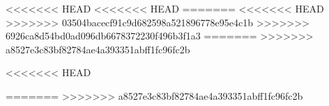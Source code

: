 \documentclass[12pt]{report} %
\begin{document}










\tableofcontents
\clearpage










\setcounter{romanPagenumber}{\value{page}}
\setcounter{page}{1}







<<<<<<< HEAD
<<<<<<< HEAD
=======
<<<<<<< HEAD
>>>>>>> 03504bacecf91c9d682598a521896778e95e4c1b
>>>>>>> 6926ca8d54bd0ad096db6678372230f496b3f1a3
=======
>>>>>>> a8527e3c83bf82784ae4a393351abff1fc96fc2b



<<<<<<< HEAD

%

%
=======
>>>>>>> a8527e3c83bf82784ae4a393351abff1fc96fc2b

\end{document}

